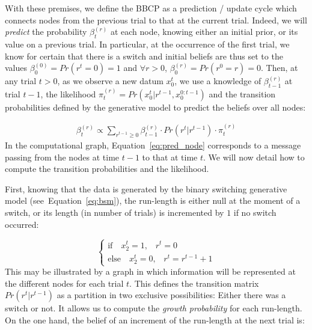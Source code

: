 \documentclass[10pt,letterpaper]{article}
\newcommand{\choice}[1]{ %
	\left\{ %
		\begin{array}{l} #1 \end{array} %
	\right. }
\newcommand{\eql}[1]{\begin{equation}#1\end{equation}}
\newcommand{\eqa}[1]{\begin{align}#1\end{align}}
\newcommand{\Ll}{\mathcal{L}}
\newcommand{\seeFig}[1]{Figure~\ref{fig:#1}}
\newcommand{\seeEq}[1]{Equation~\ref{eq:#1}}
\begin{document}
With these premises, we define the BBCP
as a prediction / update cycle
which connects nodes from the previous trial to that at the current trial.
Indeed, we will \emph{predict} the probability
$\beta^{(r)}_t$ at each node, knowing either an initial prior, or its value on a previous trial.
In particular, at the occurrence of the first trial, we know for certain that there is a switch and
initial beliefs are thus set to the values $\beta^{(0)}_0=Pr(r^t=0)=1$ and
$\forall r>0$, $\beta^{(r)}_0=Pr(r^0=r)=0$.
Then, at any trial $t>0$, as we observe a new datum $x_0^t$,
we use a knowledge of $\beta^{(r)}_{t-1}$ at trial $t-1$,
the likelihood $\pi^{(r)}_{t}=Pr(x_0^{t} | r^{t-1}, x_0^{0:t-1})$  and
the transition probabilities defined by the generative model
to predict the beliefs over all nodes: %

\eqa{
\beta^{(r)}_t \propto \sum_{r^{t-1} \geq 0} \beta^{(r)}_{t-1} \cdot Pr(r^t | r^{t-1}) \cdot  \pi^{(r)}_{t}
\label{eq:pred_node}
}
In the computational graph, %
\seeEq{pred_node} corresponds to a message passing from the nodes at time $t-1$
to that at time $t$. %
We will now detail how to compute the transition probabilities and the likelihood.

First, knowing that the data is generated by the binary switching generative model (see~\seeEq{bsm}),
the run-length is either null at the moment of a switch,
or its length (in number of trials) is incremented by $1$ if no switch occurred:

\eql{\choice{
\text{if} \quad x_2^t=1 \text{,} \quad r^t = 0\\
\text{else} \quad x_2^t=0 \text{,} \quad r^t = r^{t-1} +1 }\label{eq:run_length}}%
This may be illustrated by a graph
in which information will be represented at the different nodes for each trial $t$.
This defines the transition matrix $Pr(r^t | r^{t-1})$
as a partition in two exclusive possibilities:
Either there was a switch or not.
It allows us to compute the \emph{growth probability} for each run-length. %
On the one hand, the belief of an increment of the run-length at the next trial is: %
\end{document}
